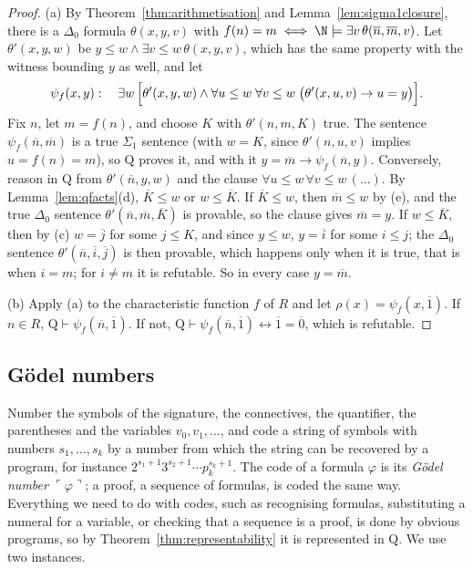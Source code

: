 \begin{proof}
(a) By Theorem~\ref{thm:arithmetisation} and Lemma~\ref{lem:sigma1closure}, there is a $\Delta_0$ formula $\theta(x,y,v)$ with $f(n)=m\iff\N\models\exists v\,\theta(\overline n,\overline m,v)$. Let $\theta'(x,y,w)$ be $y\le w\land\exists v\le w\,\theta(x,y,v)$, which has the same property with the witness bounding $y$ as well, and let
\[
\psi_f(x,y):\quad\exists w\,\Bigl[\theta'(x,y,w)\land\forall u\le w\;\forall v\le w\;\bigl(\theta'(x,u,v)\to u=y\bigr)\Bigr].
\]
Fix $n$, let $m=f(n)$, and choose $K$ with $\theta'(n,m,K)$ true. The sentence $\psi_f(\overline n,\overline m)$ is a true $\Sigma_1$ sentence (with $w=K$, since $\theta'(n,u,v)$ implies $u=f(n)=m$), so $\mathrm Q$ proves it, and with it $y=\overline m\to\psi_f(\overline n,y)$. Conversely, reason in $\mathrm Q$ from $\theta'(\overline n,y,w)$ and the clause $\forall u\le w\,\forall v\le w\,(\dots)$. By Lemma~\ref{lem:qfacts}(d), $\overline K\le w$ or $w\le\overline K$. If $\overline K\le w$, then $\overline m\le w$ by (e), and the true $\Delta_0$ sentence $\theta'(\overline n,\overline m,\overline K)$ is provable, so the clause gives $\overline m=y$. If $w\le\overline K$, then by (c) $w=\overline j$ for some $j\le K$, and since $y\le w$, $y=\overline i$ for some $i\le j$; the $\Delta_0$ sentence $\theta'(\overline n,\overline i,\overline j)$ is then provable, which happens only when it is true, that is when $i=m$; for $i\ne m$ it is refutable. So in every case $y=\overline m$.

(b) Apply (a) to the characteristic function $f$ of $R$ and let $\rho(x)=\psi_f(x,\overline1)$. If $n\in R$, $\mathrm Q\vdash\psi_f(\overline n,\overline1)$. If not, $\mathrm Q\vdash\psi_f(\overline n,\overline1)\leftrightarrow\overline1=\overline0$, which is refutable.
\end{proof}

\subsection*{Gödel numbers}

Number the symbols of the signature, the connectives, the quantifier, the parentheses and the variables $v_0,v_1,\dots$, and code a string of symbols with numbers $s_1,\dots,s_k$ by a number from which the string can be recovered by a program, for instance $2^{s_1+1}3^{s_2+1}\cdots p_k^{s_k+1}$. The code of a formula $\varphi$ is its \emph{Gödel number} $\ulcorner\varphi\urcorner$; a proof, a sequence of formulas, is coded the same way. Everything we need to do with codes, such as recognising formulas, substituting a numeral for a variable, or checking that a sequence is a proof, is done by obvious programs, so by Theorem~\ref{thm:representability} it is represented in $\mathrm Q$. We use two instances.

